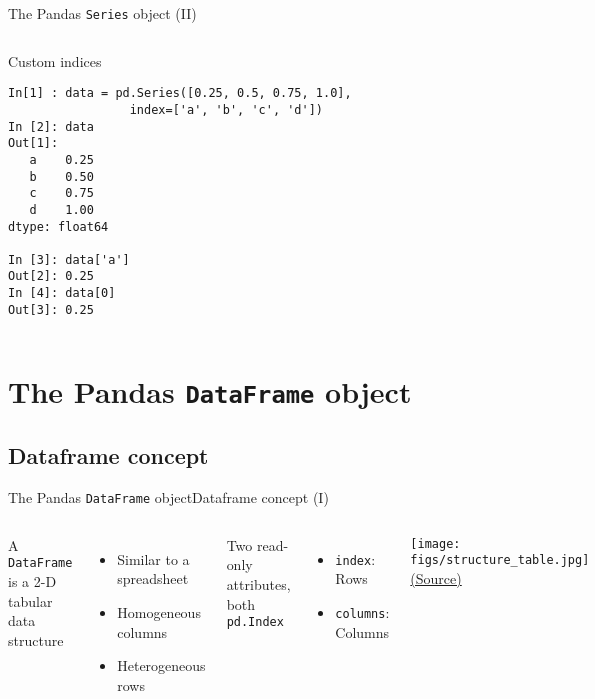 \documentclass[10pt,compress]{beamer} %
\begin{document}
\begin{frame}[fragile]{The Pandas \texttt{Series} object (II)}
	\begin{columns}
		\begin{exampleblock}{\footnotesize{Custom indices}}
		\vspace{-0.2cm} 
			\begin{lstlisting}
In[1] : data = pd.Series([0.25, 0.5, 0.75, 1.0],
                 index=['a', 'b', 'c', 'd'])
In [2]: data
Out[1]: 
   a    0.25
   b    0.50
   c    0.75
   d    1.00
dtype: float64

In [3]: data['a']
Out[2]: 0.25
In [4]: data[0]
Out[3]: 0.25
\end{lstlisting}
		\vspace{-0.2cm} 
		\end{exampleblock}
	\end{columns}
\end{frame}

\section{The Pandas \texttt{DataFrame} object}
\subsection{Dataframe concept}

\begin{frame}{The Pandas \texttt{DataFrame} object}{Dataframe concept (I)}
	\begin{columns}
 	   \column{0.6\textwidth}
		A \texttt{DataFrame} is a 2-D tabular data structure
		\begin{itemize}
			\item Similar to a spreadsheet
			\item Homogeneous columns
			\item Heterogeneous rows
		\end{itemize}
		Two read-only attributes, both \texttt{pd.Index}
		\begin{itemize}
			\item \texttt{index}: Rows
			\item \texttt{columns}: Columns
		\end{itemize}

 	   \column{0.4\textwidth}
		\centering \texttt{[image: figs/structure\_table.jpg]}\\
		\tiny \href{https://www.tutorialspoint.com/python\_pandas/python\_pandas\_dataframe.htm}{(Source)}
	\end{columns}
\end{frame}
\end{document}
